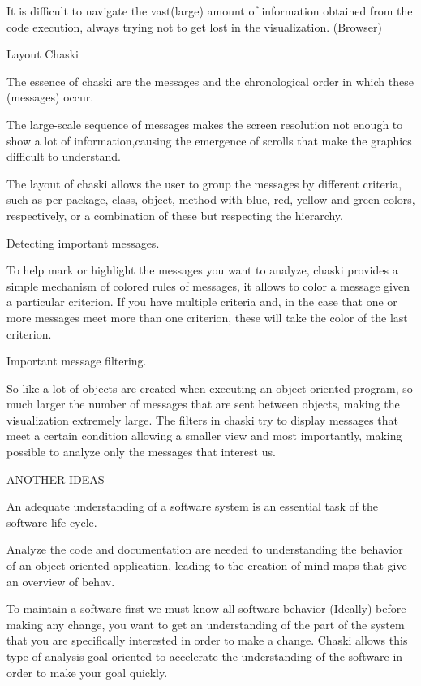 \documentclass{sig-alternate}
\begin{document}
It is difficult to navigate the vast(large) amount of information obtained from the code execution, always trying not to get lost in the visualization. (Browser)


Layout Chaski

The essence of chaski are the messages and the chronological order in which these (messages) occur.

The large-scale sequence of messages makes the screen resolution not enough to show a lot of information,causing the emergence of scrolls that make the graphics difficult to understand.

The layout of chaski allows the user to group the messages by different criteria, such as per package, class, object, method with blue, red, yellow and green colors, respectively, or a combination of these but respecting the hierarchy.

Detecting important messages.

To help mark or highlight the messages you want to analyze, chaski provides a simple mechanism of colored rules of messages, it allows to color a message given a particular criterion. If you have multiple criteria and, in the case that one or more messages meet more than one criterion, these will take the color of the last criterion.

Important message filtering.

So like a lot of objects are created when executing an object-oriented program,  so much larger the number of messages that are sent between objects, making the visualization extremely large. The filters in chaski try to display messages that meet a certain condition allowing a smaller view and most importantly, making  possible to analyze only the messages that interest us.



ANOTHER IDEAS
---------------------------------------------------------------------

An adequate understanding of a software system is an essential task of the software life cycle.

Analyze the code and documentation are needed to understanding the behavior of an object oriented application,  leading to the creation of mind maps that give an overview of behav.

To maintain a software first we must know all software behavior (Ideally) before making any change, you want to get an understanding of the part of the system that you are specifically interested in order to make a change. Chaski allows this type of analysis goal oriented to accelerate the understanding of the software in order to make your goal quickly.
\end{document}
